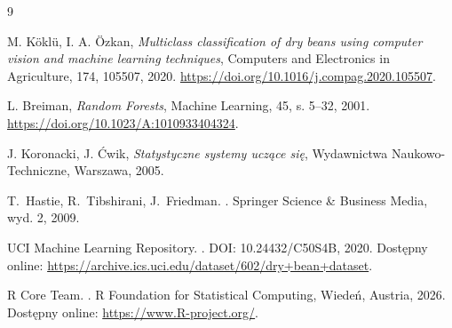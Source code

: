 \documentclass{report}
\begin{document}
\begin{thebibliography}{9}


M. Köklü, I. A. Özkan,
\textit{Multiclass classification of dry beans using computer vision and machine learning techniques},
Computers and Electronics in Agriculture, 174, 105507, 2020.
\url{https://doi.org/10.1016/j.compag.2020.105507}.

L. Breiman,
\textit{Random Forests},
Machine Learning, 45, s. 5--32, 2001.
\url{https://doi.org/10.1023/A:1010933404324}.

J. Koronacki, J. Ćwik,
\textit{Statystyczne systemy uczące się},
Wydawnictwa Naukowo-Techniczne, Warszawa, 2005.

T.~Hastie, R.~Tibshirani, J.~Friedman.
.
\newblock Springer Science \& Business Media, wyd. 2, 2009.

{UCI Machine Learning Repository}.
.
\newblock DOI: 10.24432/C50S4B, 2020.
\newblock Dostępny online: \url{https://archive.ics.uci.edu/dataset/602/dry+bean+dataset}.

{R Core Team}.
.
\newblock R Foundation for Statistical Computing, Wiedeń, Austria, 2026.
\newblock Dostępny online: \url{https://www.R-project.org/}.

\end{thebibliography}
\end{document}
